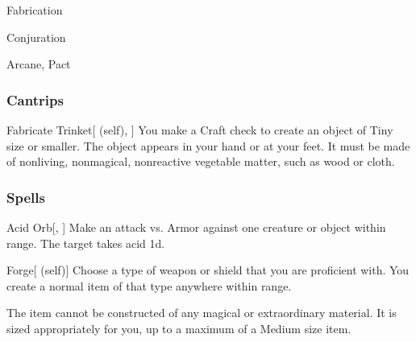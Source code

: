 \newpage
\begin{spellsection}{Fabrication}

\begin{spellheader}
\end{spellheader}


 Conjuration

 Arcane, Pact

\subsubsection{Cantrips}


\begin{attuneability}{Fabricate Trinket}[ (self), ]
You make a Craft check to create an object of Tiny size or smaller.
The object appears in your hand or at your feet.
It must be made of nonliving, nonmagical, nonreactive vegetable matter, such as wood or cloth.
\end{attuneability}

\end{spellsection}


\subsubsection{Spells}


\lowercase{\hypertarget{spell:Acid Orb}{}}\label{spell:Acid Orb}
\begin{freeability}[\nth{1}]{\hypertarget{spell:Acid Orb}{Acid Orb}}[, ]
Make an attack vs. Armor against one creature or object within \rngmed range.
\hit The target takes acid  \plus1d.
\end{freeability}
\vspace{0.25em}



\lowercase{\hypertarget{spell:Forge}{}}\label{spell:Forge}
\begin{attuneability}[\nth{1}]{\hypertarget{spell:Forge}{Forge}}[ (self)]
Choose a type of weapon or shield that you are proficient with.
You create a normal item of that type anywhere within \rngclose range.

The item cannot be constructed of any magical or extraordinary material.
It is sized appropriately for you, up to a maximum of a Medium size item.
\end{attuneability}
\vspace{0.25em}




